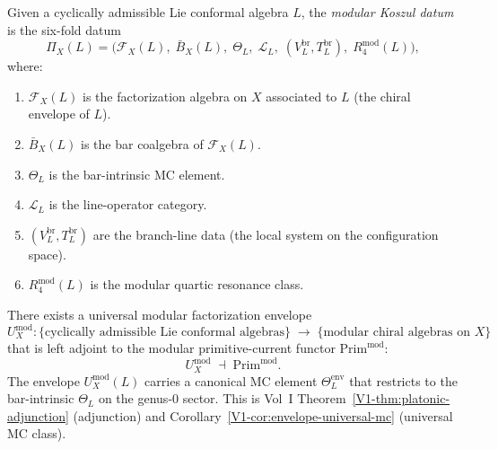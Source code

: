\begin{construction}
Given a cyclically admissible Lie conformal algebra $L$, the
\emph{modular Koszul datum} is the six-fold datum
\begin{equation}%
\Pi_X(L) = \bigl(
\mathcal{F}_X(L),\;
\bar{B}_X(L),\;
\Theta_L,\;
\mathcal{L}_L,\;
(V^{\mathrm{br}}_L, T^{\mathrm{br}}_L),\;
R_4^{\mathrm{mod}}(L)
\bigr),
\end{equation}
where:
\begin{enumerate}[label=\textup{(\alph*)}]
\item $\mathcal{F}_X(L)$ is the factorization algebra on $X$
 associated to $L$ (the chiral envelope of $L$).
\item $\bar{B}_X(L)$ is the bar coalgebra of $\mathcal{F}_X(L)$.
\item $\Theta_L$ is the bar-intrinsic MC element.
\item $\mathcal{L}_L$ is the line-operator category.
\item $(V^{\mathrm{br}}_L, T^{\mathrm{br}}_L)$ are the branch-line
 data (the local system on the configuration space).
\item $R_4^{\mathrm{mod}}(L)$ is the modular quartic resonance class.
\end{enumerate}
\end{construction}

\begin{theorem}
There exists a universal modular factorization envelope
\begin{equation}%
U^{\mathrm{mod}}_X: \{\text{cyclically admissible Lie conformal algebras}\}
\;\longrightarrow\;
\{\text{modular chiral algebras on } X\}
\end{equation}
that is left adjoint to the modular primitive-current functor
$\mathrm{Prim}^{\mathrm{mod}}$:
\begin{equation}%
U^{\mathrm{mod}}_X \;\dashv\; \mathrm{Prim}^{\mathrm{mod}}.
\end{equation}
The envelope $U^{\mathrm{mod}}_X(L)$ carries a canonical MC element
$\Theta^{\mathrm{env}}_L$ that restricts to the bar-intrinsic
$\Theta_L$ on the genus-$0$ sector.
This is Vol~I Theorem~\ref{V1-thm:platonic-adjunction}
(adjunction) and Corollary~\ref{V1-cor:envelope-universal-mc}
(universal MC class).
\end{theorem}

